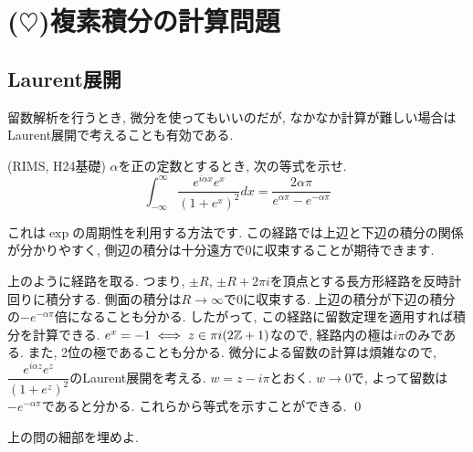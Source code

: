 \section{($\heartsuit$)複素積分の計算問題}

\subsection{Laurent展開}
留数解析を行うとき, 微分を使ってもいいのだが, なかなか計算が難しい場合はLaurent展開で考えることも有効である.

\begin{egprob} (RIMS, H24基礎)
$\alpha$を正の定数とするとき, 次の等式を示せ.
\[\int_{-\infty}^{\infty} \dfrac{e^{i\alpha x}e^x}{(1+e^x)^2}dx = \dfrac{2\alpha \pi}{e^{\alpha \pi} - e^{-\alpha\pi}}\]
\end{egprob}

\begin{screen}
\begin{point}
 これは$\exp$の周期性を利用する方法です. この経路では上辺と下辺の積分の関係が分かりやすく, 側辺の積分は十分遠方で0に収束することが期待できます.
\end{point}
\end{screen}

\begin{egans}
上のように経路を取る. つまり, $\pm R$, $\pm R + 2\pi i$を頂点とする長方形経路を反時計回りに積分する. 側面の積分は$R\to \infty$で0に収束する. 上辺の積分が下辺の積分の$-e^{-\alpha \pi}$倍になることも分かる. したがって, この経路に留数定理を適用すれば積分を計算できる. $e^{x} = -1 \iff z \in \pi i (2\mathbb{Z} + 1)$なので, 経路内の極は$i\pi$のみである. また, 2位の極であることも分かる. 微分による留数の計算は煩雑なので, $\dfrac{e^{i\alpha z}e^z}{(1+e^z)^2}$のLaurent展開を考える. $w = z-i\pi$とおく. $w\to 0$で,
よって留数は$-e^{-\alpha\pi}$であると分かる. これらから等式を示すことができる. \qed
\end{egans}
\begin{prac}
上の問の細部を埋めよ.
\end{prac}


